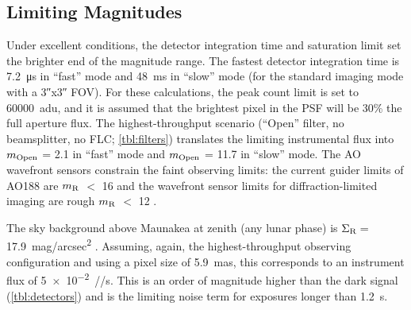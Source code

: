 \subsection{Limiting Magnitudes}

Under excellent conditions, the detector integration time and saturation limit set the brighter end of the magnitude range. The fastest detector integration time is \SI{7.2}{\micro\second} in ``fast'' mode and \SI{48}{\milli\second} in ``slow'' mode (for the standard imaging mode with a \ang{;;3}x\ang{;;3} FOV). For these calculations, the peak count limit is set to \SI{60000}{adu}, and it is assumed that the brightest pixel in the PSF will be 30\% the full aperture flux. The highest-throughput scenario (``Open'' filter, no beamsplitter, no FLC; \autoref{tbl:filters}) translates the limiting instrumental flux into $m_{\rm Open}$ = 2.1 in ``fast'' mode and $m_{\rm Open}$ = 11.7 in ``slow'' mode. The AO wavefront sensors constrain the faint observing limits: the current guider limits of AO188 are $m_{\rm R}$ $<$ 16 and the wavefront sensor limits for diffraction-limited imaging are rough $m_{\rm R}$ $<$ 12 \citep{minowa_performance_2010}.

The sky background above Maunakea at zenith (any lunar phase) is $\Sigma_{\rm R}=$\SI{17.9}{mag/arcsec^2} \citep{roth_measurements_2016}. Assuming, again, the highest-throughput observing configuration and using a pixel size of \SI{5.9}{mas}, this corresponds to an instrument flux of \SI{5e-2}{\electron/\pixel/\second}. This is an order of magnitude higher than the dark signal (\autoref{tbl:detectors}) and is the limiting noise term for exposures longer than \SI{1.2}{\second}.
